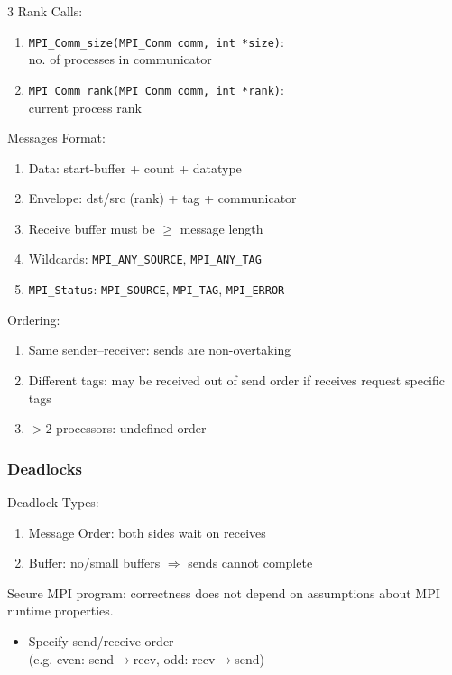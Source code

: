 \documentclass[12pt, a4paper]{article}
\begin{document}
\begin{multicols*}{3}
Rank Calls:
\begin{enumerate}[\roman*.]
  \item \lstinline|MPI_Comm_size(MPI_Comm comm, int *size)|:\\ no. of processes in communicator
  \item \lstinline|MPI_Comm_rank(MPI_Comm comm, int *rank)|:\\ current process rank
\end{enumerate}

Messages Format:
\begin{enumerate}[\roman*.]
  \item Data: start-buffer + count + datatype
  \item Envelope: dst/src (rank) + tag + communicator
  \item Receive buffer must be \(\ge\) message length
  \item Wildcards: \lstinline|MPI_ANY_SOURCE|, \lstinline|MPI_ANY_TAG|
  \item \lstinline|MPI_Status|: \lstinline|MPI_SOURCE|, \lstinline|MPI_TAG|, \lstinline|MPI_ERROR|
\end{enumerate}

Ordering:
\begin{enumerate}[\roman*.]
  \item Same sender--receiver: sends are non-overtaking
  \item Different tags: may be received out of send order if receives request specific tags
  \item $>2$ processors: undefined order
\end{enumerate}

\subsubsection{Deadlocks}
Deadlock Types: 
\begin{enumerate}[\roman*.]
  \item Message Order: both sides wait on receives
  \item Buffer: no/small buffers $\Rightarrow$ sends cannot complete
\end{enumerate}

Secure MPI program: correctness does not depend on assumptions about MPI runtime properties.
\begin{itemize}
  \item Specify send/receive order\\(e.g. even: send$\rightarrow$recv, odd: recv$\rightarrow$send) 
\end{itemize}


\end{multicols*}
\end{document}

